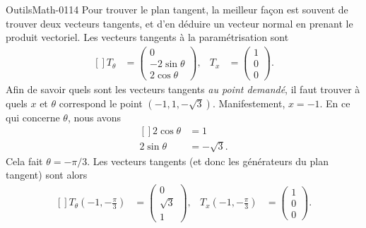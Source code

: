 \begin{corrige}{OutilsMath-0114}
    Pour trouver le plan tangent, la meilleur façon est souvent de trouver deux vecteurs tangents, et d'en déduire un vecteur normal en prenant le produit vectoriel. Les vecteurs tangents à la paramétrisation sont 
    \begin{equation}
        \begin{aligned}[]
            T_{\theta}&=\begin{pmatrix}
                0    \\ 
                -2\sin\theta    \\ 
                2\cos\theta    
            \end{pmatrix},&
            T_x&=\begin{pmatrix}
                1    \\ 
                0    \\ 
                0    
            \end{pmatrix}.
        \end{aligned}
    \end{equation}
    Afin de savoir quels sont les vecteurs tangents \emph{au point demandé},  il faut trouver à quels $x$ et $\theta$ correspond le point $(-1,1,-\sqrt{3})$. Manifestement, $x=-1$. En ce qui concerne $\theta$, nous avons
    \begin{equation}
        \begin{aligned}[]
            2\cos\theta&=1\\
            2\sin\theta&=-\sqrt{3}.
        \end{aligned}
    \end{equation}
    Cela fait $\theta=-\pi/3$. Les vecteurs tangents (et donc les générateurs du plan tangent) sont alors
    \begin{equation}
        \begin{aligned}[]
            T_{\theta}(-1,-\frac{ \pi }{ 3 })&=\begin{pmatrix}
                0    \\ 
                \sqrt{3}    \\ 
                1    
            \end{pmatrix},&
            T_x(-1,-\frac{ \pi }{ 3 })&=\begin{pmatrix}
                1    \\ 
                0    \\ 
                0    
            \end{pmatrix}.
        \end{aligned}
    \end{equation}
    

\end{corrige}
